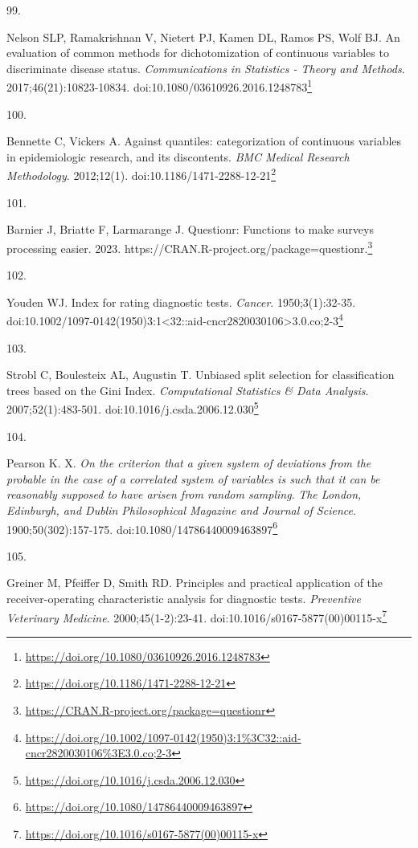 \documentclass[
  a4paper,
]{book}
\newlength{\cslhangindent}
\newlength{\csllabelwidth}
\newlength{\cslentryspacingunit} %
\newenvironment{CSLReferences}[2] %
 {%
  \setlength{\parindent}{0pt}
  \ifodd #1
  \let\oldpar\par
  \def\par{\hangindent=\cslhangindent\oldpar}
  \fi
  \setlength{\parskip}{#2\cslentryspacingunit}
 }%
 {}
\newcommand{\CSLLeftMargin}[1]{\parbox[t]{\csllabelwidth}{#1}}
\newcommand{\CSLRightInline}[1]{\parbox[t]{\linewidth - \csllabelwidth}{#1}\break}
\renewcommand{\href}[2]{#2\footnote{\url{#1}}}
\begin{document}
\begin{CSLReferences}{0}{0}
\leavevmode{}%
\CSLLeftMargin{99. }%
\CSLRightInline{Nelson SLP, Ramakrishnan V, Nietert PJ, Kamen DL, Ramos PS, Wolf BJ. An evaluation of common methods for dichotomization of continuous variables to discriminate disease status. \emph{Communications in Statistics - Theory and Methods}. 2017;46(21):10823-10834. doi:\href{https://doi.org/10.1080/03610926.2016.1248783}{10.1080/03610926.2016.1248783}}

\leavevmode{}%
\CSLLeftMargin{100. }%
\CSLRightInline{Bennette C, Vickers A. Against quantiles: categorization of continuous variables in epidemiologic research, and its discontents. \emph{BMC Medical Research Methodology}. 2012;12(1). doi:\href{https://doi.org/10.1186/1471-2288-12-21}{10.1186/1471-2288-12-21}}

\leavevmode{}%
\CSLLeftMargin{101. }%
\CSLRightInline{Barnier J, Briatte F, Larmarange J. Questionr: Functions to make surveys processing easier. 2023. \href{https://CRAN.R-project.org/package=questionr}{https://CRAN.R-project.org/package=questionr.}}

\leavevmode{}%
\CSLLeftMargin{102. }%
\CSLRightInline{Youden WJ. Index for rating diagnostic tests. \emph{Cancer}. 1950;3(1):32-35. doi:\href{https://doi.org/10.1002/1097-0142(1950)3:1\%3C32::aid-cncr2820030106\%3E3.0.co;2-3}{10.1002/1097-0142(1950)3:1\textless32::aid-cncr2820030106\textgreater3.0.co;2-3}}

\leavevmode{}%
\CSLLeftMargin{103. }%
\CSLRightInline{Strobl C, Boulesteix AL, Augustin T. Unbiased split selection for classification trees based on the Gini Index. \emph{Computational Statistics \& Data Analysis}. 2007;52(1):483-501. doi:\href{https://doi.org/10.1016/j.csda.2006.12.030}{10.1016/j.csda.2006.12.030}}

\leavevmode{}%
\CSLLeftMargin{104. }%
\CSLRightInline{Pearson K. X. {\emph{On the criterion that a given system of deviations from the probable in the case of a correlated system of variables is such that it can be reasonably supposed to have arisen from random sampling}}. \emph{The London, Edinburgh, and Dublin Philosophical Magazine and Journal of Science}. 1900;50(302):157-175. doi:\href{https://doi.org/10.1080/14786440009463897}{10.1080/14786440009463897}}

\leavevmode{}%
\CSLLeftMargin{105. }%
\CSLRightInline{Greiner M, Pfeiffer D, Smith RD. Principles and practical application of the receiver-operating characteristic analysis for diagnostic tests. \emph{Preventive Veterinary Medicine}. 2000;45(1-2):23-41. doi:\href{https://doi.org/10.1016/s0167-5877(00)00115-x}{10.1016/s0167-5877(00)00115-x}}


\end{CSLReferences}
\end{document}
